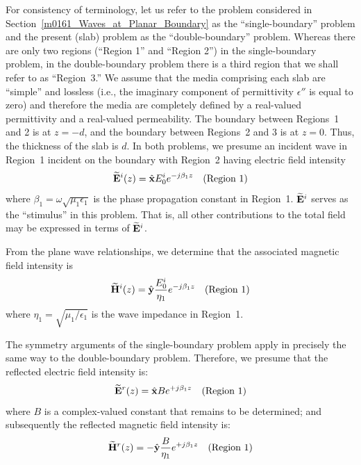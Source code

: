 For consistency of terminology, let us refer to the problem considered in Section~\ref{m0161_Waves_at_Planar_Boundary} as the ``single-boundary'' problem and the present (slab) problem as the ``double-boundary'' problem.
Whereas there are only two regions (``Region 1'' and ``Region 2'') in the single-boundary problem, in the double-boundary problem there is a third region that we shall refer to as ``Region~3.''
We assume that the media comprising each slab are ``simple'' and lossless (i.e., the imaginary component of permittivity $\epsilon''$ is equal to zero) and therefore the media are completely defined by a real-valued permittivity and a real-valued permeability.
The boundary between Regions~1 and 2 is at $z=-d$, and the boundary between Regions~2 and 3 is at $z=0$.
Thus, the thickness of the slab is $d$.
In both problems, we presume an incident wave in Region~1 incident on the boundary with Region~2 having electric field intensity
%
\begin{equation}
\widetilde{\bf E}^i(z) = \hat{\bf x} E_0^i e^{-j\beta_1 z}~~~\mbox{(Region~1)}
\label{m0162_eEi}
\end{equation}
%
where $\beta_1=\omega\sqrt{\mu_1 \epsilon_1}$ is the phase propagation constant in Region~1. 
$\widetilde{\bf E}^i$ serves as the ``stimulus'' in this problem.
That is, all other contributions to the total field may be expressed in terms of $\widetilde{\bf E}^i$.

From the plane wave relationships, we determine that the associated magnetic field intensity is
%
\begin{equation}
\widetilde{\bf H}^i(z) = \hat{\bf y} \frac{E_0^i}{\eta_1}  e^{-j\beta_1 z}~~~\mbox{(Region~1)}
\label{m0162_eHi}
\end{equation}
%
where $\eta_1=\sqrt{\mu_1 / \epsilon_1}$ is the wave impedance in Region~1.

The symmetry arguments of the single-boundary problem apply in precisely the same way to the double-boundary problem.
Therefore, we presume that the reflected electric field intensity is:
%
\begin{equation}
\widetilde{\bf E}^r(z) = \hat{\bf x} B e^{+j\beta_1 z}~~~\mbox{(Region~1)}
\label{m0162_eEr}
\end{equation}
%
where $B$ is a complex-valued constant that remains to be determined;
and subsequently the reflected magnetic field intensity is:
%
\begin{equation}
\widetilde{\bf H}^r(z) = -\hat{\bf y} \frac{B}{\eta_1} e^{+j\beta_1 z}~~~\mbox{(Region~1)}
\label{m0162_eHr}
\end{equation}

